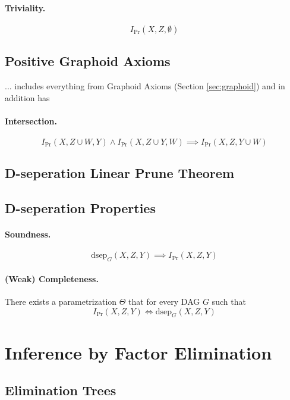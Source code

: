 \documentclass[11pt]{article}
\newcommand{\pr}{\mathrm{Pr}}
\newcommand{\dsep}{\mathrm{dsep}}
\begin{document}
\paragraph{Triviality.}
\begin{equation}
	I_\pr (X, Z, \emptyset) 
\end{equation}

\subsection{Positive Graphoid Axioms}
... includes everything from Graphoid Axioms (Section \ref{sec:graphoid}) and in addition has 
\paragraph{Intersection.}
\begin{equation}
	I _ \pr (X, Z \cup W, Y ) \land I _\pr (X, Z \cup Y , W ) \implies I _\pr (X, Z, Y \cup W)
\end{equation}

\subsection{D-seperation Linear Prune Theorem}

\subsection{D-seperation Properties}
\paragraph{Soundness.} 
\begin{equation}
	\dsep_ G ( X, Z, Y ) \implies I _\pr (X, Z, Y)
\end{equation}

\paragraph{(Weak) Completeness.}
There exists a parametrization $\Theta$ that for every DAG $G$ such that
\begin{equation}
	I_\pr (X, Z, Y) \iff \dsep_G (X, Z, Y)
\end{equation}

\section{Inference by Factor Elimination}
\subsection{Elimination Trees}
\end{document}
